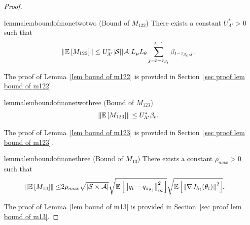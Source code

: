 \documentclass[twoside,11pt]{article}
\newcommand{\fS}{\mathcal{S}}
\newcommand{\fA}{\mathcal{A}}
\newcommand{\E}{\mathbb{E}}
\newcommand{\nsa}{{|\fS \times \fA|}}
\newcommand{\ns}{{|\fS|}}
\newcommand{\na}{{|\fA|}}
\numberwithin{assucounter}{section}
\begin{document}
\begin{proof}
\begin{restatable}{lemma}{lemboundofmonetwotwo}
  \label{lem bound of m122}
  (Bound of $M_{122}$)
  There exists a constant $U_{\Lambda'}^* > 0$ such that
  \begin{align}
      \norm{\E\left[M_{122}\right]} \leq U_{\Lambda'}^* \ns \na L_\mu L_\theta \sum_{j=t-\tau_{\beta_t}}^{t-1} \beta_{t-\tau_{\beta_t}, j}.
  \end{align}
\end{restatable}
\noindent
The proof of Lemma~\ref{lem bound of m122} is provided in Section~\ref{sec proof lem bound of m122}

\begin{restatable}{lemma}{lemboundofmonetwothree}
  \label{lem bound of m123}
  (Bound of $M_{123}$)
  \begin{align}
    \norm{\E\left[M_{123}\right]} \leq U_{\Lambda'}^* \beta_t.
  \end{align}
\end{restatable}
\noindent
The proof of Lemma~\ref{lem bound of m123} is provided in Section~\ref{sec proof lem bound of m123}.

\begin{restatable}{lemma}{lemboundofmonethree}
  \label{lem bound of m13}
  (Bound of $M_{13}$)
  There exists a constant $\rho_{max} > 0$ such that
  \begin{align}
    \norm{\E\left[M_{13}\right]}\leq& 2\rho_{max} \sqrt{\nsa}\sqrt{\E\left[\norm{q_t - q_{\pi_{\theta_t}}}_\infty^2 \right]} \sqrt{\E\left[\norm{\nabla J_{\lambda_t}(\theta_t)}^2\right]}.
  \end{align}
\end{restatable}
\noindent
The proof of Lemma~\ref{lem bound of m13} is provided in Section~\ref{sec proof lem bound of m13}.


\end{proof}
\end{document}
